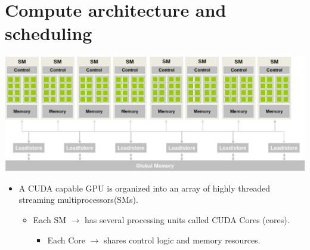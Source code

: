 \chapter{Compute architecture and scheduling}
\begin{center}
    \includegraphics[width=0.7\linewidth]{Images/CompArch/CUDA_GPU.png}
\end{center}
\begin{itemize}
    \item A CUDA capable GPU is organized into an array of highly threaded streaming multiprocessors(SMs).
          \begin{itemize}
              \item Each SM $\rightarrow$ has several processing units called CUDA Cores (cores).
                    \begin{itemize}
                        \item Each Core $\rightarrow$ shares control logic and memory resources.
                    \end{itemize}
          \end{itemize}
\end{itemize}


